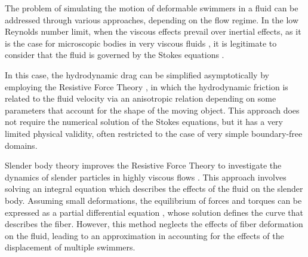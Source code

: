 \documentclass[graybox]{svmult}
\begin{document}





The problem of simulating the motion of deformable swimmers in a fluid can be addressed through various approaches, depending on the flow regime. In the low Reynolds number limit, when the viscous effects prevail over inertial effects, as it is the case for microscopic bodies in very viscous fluids \cite{huang_life_2013}, it is legitimate to consider that the fluid is governed by the Stokes equations \cite{happel_low_2012,lauga_hydrodynamics_2009}. 



In this case, the hydrodynamic drag can be simplified asymptotically by employing the Resistive Force Theory \cite{gray_propulsion_1955}, in which the hydrodynamic friction is related to the fluid velocity via an %
anisotropic relation %
depending on some parameters that account for the shape of the moving object. This approach does not require the numerical solution of the Stokes equations, but it has a
very limited physical validity, often restricted to the case of very simple boundary-free domains.

Slender body theory improves the Resistive Force Theory
to investigate the dynamics of slender particles in highly viscous flows \cite{cox_motion_1970, batchelor_slender-body_1970, keller_slender-body_1976,johnson_improved_1980}. 
This approach involves solving an integral equation which describes the effects of the fluid on the slender body. Assuming small deformations, the equilibrium of forces and torques can be expressed as a partial differential equation \cite{gadelha_counterbend_2013,  moreau_asymptotic_2018, el_khiyati_steering_2023}, whose solution defines the curve that describes the fiber. However, this method neglects the effects of fiber deformation on the fluid, leading to an approximation in accounting for the effects of the displacement of multiple swimmers.
\end{document}
